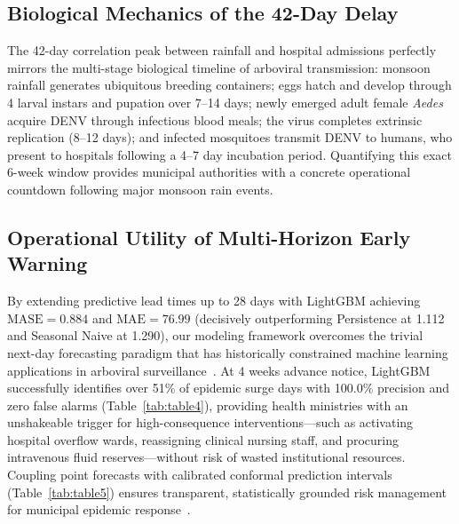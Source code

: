 \documentclass[11pt,a4paper]{article}
\begin{document}
\subsection{Biological Mechanics of the 42-Day Delay}
The 42-day correlation peak between rainfall and hospital admissions perfectly mirrors the multi-stage biological timeline of arboviral transmission: monsoon rainfall generates ubiquitous breeding containers; eggs hatch and develop through 4 larval instars and pupation over 7--14 days; newly emerged adult female \textit{Aedes} acquire DENV through infectious blood meals; the virus completes extrinsic replication (8--12 days); and infected mosquitoes transmit DENV to humans, who present to hospitals following a 4--7 day incubation period. Quantifying this exact 6-week window provides municipal authorities with a concrete operational countdown following major monsoon rain events.

\subsection{Operational Utility of Multi-Horizon Early Warning}
By extending predictive lead times up to 28 days with LightGBM achieving $\text{MASE} = 0.884$ and $\text{MAE} = 76.99$ (decisively outperforming Persistence at 1.112 and Seasonal Naive at 1.290), our modeling framework overcomes the trivial next-day forecasting paradigm that has historically constrained machine learning applications in arboviral surveillance~\cite{hyndman2006another,johansson2019open}. At 4 weeks advance notice, LightGBM successfully identifies over 51\% of epidemic surge days with 100.0\% precision and zero false alarms (Table~\ref{tab:table4}), providing health ministries with an unshakeable trigger for high-consequence interventions---such as activating hospital overflow wards, reassigning clinical nursing staff, and procuring intravenous fluid reserves---without risk of wasted institutional resources. Coupling point forecasts with calibrated conformal prediction intervals (Table~\ref{tab:table5}) ensures transparent, statistically grounded risk management for municipal epidemic response~\cite{vovk2005algorithmic,angelopoulos2021gentle,tibshirani2019conformal}.
\end{document}

